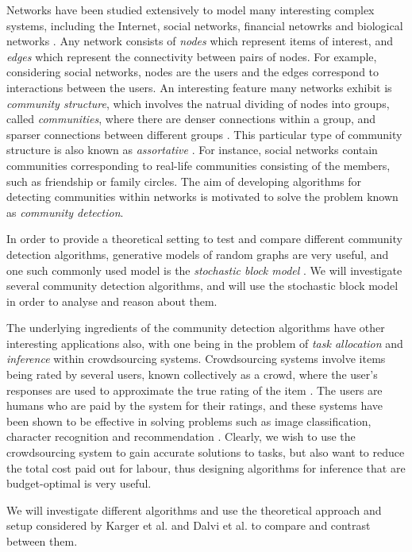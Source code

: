 \documentclass[12pt]{article}
\numberwithin{equation}{section}
\begin{document}
Networks have been studied extensively to model many interesting complex systems, including the Internet, social networks, financial netowrks and biological networks \cite{New06a,DKM+13,MG13}. Any network consists of \textit{nodes} which represent items of interest, and \textit{edges} which represent the connectivity between pairs of nodes. For example, considering social networks, nodes are the users and the edges correspond to interactions between the users. An interesting feature many networks exhibit is \textit{community structure}, which involves the natrual dividing of nodes into groups, called \textit{communities}, where there are denser connections within a group, and sparser connections between different groups \cite{New06a,DKM+13,For10,New06b}. This particular type of community structure is also known as \textit{assortative} \cite{DKM+13}. For instance, social networks contain communities corresponding to real-life communities consisting of the members, such as friendship or family circles. The aim of developing algorithms for detecting communities within networks is motivated to solve the problem known as \textit{community detection}.

In order to provide a theoretical setting to test and compare different community detection algorithms, generative models of random graphs are very useful, and one such commonly used model is the \textit{stochastic block model} \cite{DKM+13,NN12}. We will investigate several community detection algorithms, and will use the stochastic block model in order to analyse and reason about them.

The underlying ingredients of the community detection algorithms have other interesting applications also, with one being in the problem of \textit{task allocation} and \textit{inference} within crowdsourcing systems. Crowdsourcing systems involve items being rated by several users, known collectively as a crowd, where the user's responses are used to approximate the true rating of the item \cite{KOS13,EHR12}. The users are humans who are paid by the system for their ratings, and these systems have been shown to be effective in solving problems such as image classification, character recognition and recommendation \cite{KOS13}. Clearly, we wish to use the crowdsourcing system to gain accurate solutions to tasks, but also want to reduce the total cost paid out for labour, thus designing algorithms for inference that are budget-optimal is very useful.

We will investigate different algorithms and use the theoretical approach and setup considered by Karger et al.\cite{KOS13} and Dalvi et al. \cite{DDK+13} to compare and contrast between them.
\end{document}
